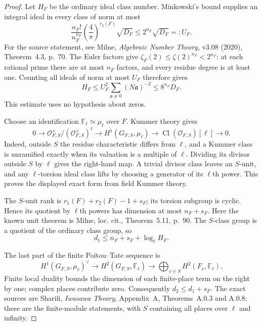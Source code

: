 \begin{proof}
Let $H_F$ be the ordinary ideal class number.
Minkowski's bound supplies an integral ideal in every
class of norm at most
\[
 \frac{n_F!}{n_F^{n_F}}
       \left(\frac4\pi\right)^{r_2(F)}\sqrt{D_F}
       \leq2^{n_F}\sqrt{D_F}=:U_F.
\]
For the source statement, see Milne,
\emph{Algebraic Number Theory}, v3.08 (2020),
Theorem~4.3, p.~70.
The Euler factors give $\zeta_F(2)\leq\zeta(2)^{n_F}<2^{n_F}$:
at each rational prime there are at most $n_F$ factors,
and every residue degree is at least one.
Counting all ideals of norm at most $U_F$ therefore gives
\[
 H_F\leq U_F^2\sum_{\mathfrak a\ne0}(N\mathfrak a)^{-2}
             \leq8^{n_F}D_F.                         \tag{FG.5}
\]
This estimate uses no hypothesis about zeros.

Choose an identification $\mathbb F_\ell\simeq\mu_\ell$
over $F$.  Kummer theory gives
\[
 0\longrightarrow\mathcal O_{F,S}^{\times}/
                    (\mathcal O_{F,S}^{\times})^\ell
 \longrightarrow H^1(G_{F,S},\mu_\ell)
 \longrightarrow\operatorname{Cl}(\mathcal O_{F,S})[\ell]
 \longrightarrow0.                                  \tag{FG.6}
\]
Indeed, outside $S$ the residue characteristic differs
from $\ell$, and a Kummer class is unramified exactly
when its valuation is a multiple of $\ell$.
Dividing its divisor outside $S$ by $\ell$ gives the
right-hand map.  A trivial divisor class leaves an
$S$-unit, and any $\ell$-torsion ideal class lifts by
choosing a generator of its $\ell$th power.  This proves
the displayed exact form from field Kummer theory.

The $S$-unit rank is $r_1(F)+r_2(F)-1+s_F$; its torsion
subgroup is cyclic.  Hence its quotient by $\ell$th
powers has dimension at most $n_F+s_F$.
Here the known unit theorem is Milne, loc. cit.,
Theorem~5.11, p.~90.
The $S$-class group is a quotient of the ordinary class
group, so
\[
             d_1\leq n_F+s_F+\log_\ell H_F.           \tag{FG.7}
\]

The last part of the finite Poitou--Tate sequence is
\[
 H^1(G_{F,S},\mu_\ell)^\vee
 \longrightarrow H^2(G_{F,S},\mathbb F_\ell)
 \longrightarrow\bigoplus_{v\in S}H^2(F_v,\mathbb F_\ell).
\]
Finite local duality bounds the dimension of each finite-place
term on the right by one; complex places contribute zero.
Consequently $d_2\leq d_1+s_F$.
The exact sources are Sharifi, \emph{Iwasawa Theory},
Appendix~A, Theorems~A.0.3 and A.0.8; these are the
finite-module statements, with $S$ containing all places
over $\ell$ and infinity.


\end{proof}
